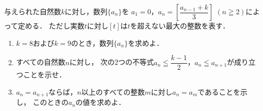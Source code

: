 \documentclass[../../main.tex]{subfiles}
\begin{document}
与えられた自然数$k$に対し，数列$\{a_n\}$を
$a_1=0$，$\displaystyle a_n=\left[\dfrac{a_{n-1}+k}{3}\right]$ $(n\geqq2)$によって定める．
ただし実数$t$に対し$[t]$は$t$を超えない最大の整数を表す．
\begin{enumerate}
  \item $k=8$および$k=9$のとき，数列$\{a_n\}$を求めよ．
  \item すべての自然数$n$に対し，
    次の2つの不等式$\displaystyle a_n\leqq\dfrac{k-1}{2}$，$a_n \leqq a_{n+1}$が成り立つことを示せ．
  \item $a_n=a_{n+1}$ならば，$n$以上のすべての整数$m$に対し$a_n=a_m$であることを示し，
    このときの$a_n$の値を求めよ．
\end{enumerate}
\end{document}
